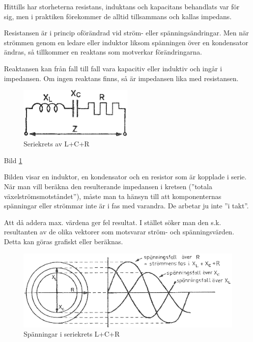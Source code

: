 Hittills har storheterna resistans, induktans och kapacitans behandlats var för
sig, men i praktiken förekommer de alltid tillsammans och kallas impedans.

Resistansen är i princip oförändrad vid ström- eller spänningsändringar. Men när
strömmen genom en ledare eller induktor liksom spänningen över en kondensator
ändras, så tillkommer en reaktans som motverkar förändringarna.

Reaktansen kan från fall till fall vara kapacitiv eller induktiv och ingår i
impedansen. Om ingen reaktans finns, så är impedansen lika med resistansen.

\begin{figure}
\includegraphics[width=0.5\textwidth]{images/cropped_pdfs/bild_2_3-12.pdf}
\caption{Seriekrets av L+C+R}
\label{fig:BildII3-12}
\end{figure}

Bild \ref{fig:BildII3-12}

Bilden visar en induktor, en kondensator och en resistor som är kopplade i
serie. När man vill beräkna den resulterande impedansen i kretsen
(''totala växelströmsmotståndet''), måste man ta hänsyn till att komponenternas
spänningar eller strömmar inte är i fas med varandra. De arbetar ju inte
''i takt''.

Att då addera max. värdena ger fel resultat. I stället söker man den s.k.
resultanten av de olika vektorer som motsvarar ström- och spänningsvärden.
Detta kan göras grafiskt eller beräknas.

\begin{figure}
\includegraphics[width=\textwidth]{images/cropped_pdfs/bild_2_3-13.pdf}
\caption{Spänningar i seriekrets L+C+R}
\label{fig:BildII3-13}
\end{figure}

